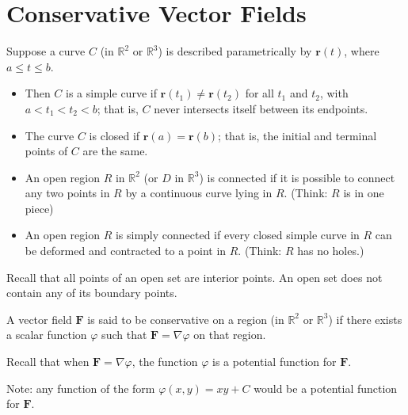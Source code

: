 \documentclass[../calc3.tex]{subfiles}
\begin{document}
\section{Conservative Vector Fields}
\begin{definition}
    Suppose a curve $C$ (in $\mathbb{R}^2$ or $\mathbb{R}^3$) is described parametrically by $\textbf{r}(t)$, where $a\leq t\leq b$.
    \begin{itemize}
        \item Then $C$ is a simple curve if $\textbf{r}(t_1)\neq \textbf{r}(t_2)$ for all $t_1$ and $t_2$, with $a<t_1<t_2<b$; that is, $C$ never intersects itself between its endpoints.
        \item The curve $C$ is closed if $\textbf{r}(a)=\textbf{r}(b)$; that is, the initial and terminal points of $C$ are the same.
    \end{itemize}
\end{definition}

\begin{definition}
    \begin{itemize}
        \item An open region $R$ in $\mathbb{R}^2$ (or $D$ in $\mathbb{R}^3$) is connected if it is possible to connect any two points in $R$ by a continuous curve lying in $R$. (Think: $R$ is in one piece)
        \item An open region $R$ is simply connected if every closed simple curve in $R$ can be deformed and contracted to a point in $R$. (Think: $R$ has no holes.)
    \end{itemize}
    Recall that all points of an open set are interior points. An open set does not contain any of its boundary points.
\end{definition}

\begin{definition}
    A vector field $\textbf{F}$ is said to be conservative on a region (in $\mathbb{R}^2$ or $\mathbb{R}^3$) if there exists a 
    scalar function $\varphi$ such that $\textbf{F} = \nabla\varphi$ on that region.

    Recall that when $\textbf{F}=\nabla\varphi$, the function $\varphi$ is a potential function for $\textbf{F}$.

    Note: any function of the form $\varphi(x,y)=xy+C$ would be a potential function for $\textbf{F}$.
\end{definition}
\end{document}
